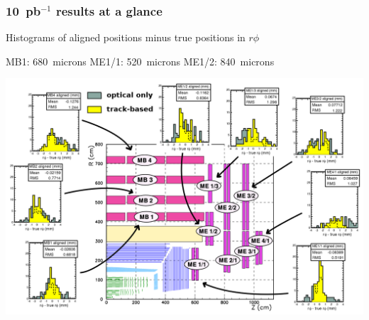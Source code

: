 \documentclass[compress]{beamer}
\begin{document}
\begin{frame}
\frametitle{10~pb$^{-1}$ results at a glance}
\small
Histograms of aligned positions minus true positions in $r\phi$

MB1: 680~microns \hspace{0.3 cm} ME1/1: 520~microns \hspace{0.3 cm} ME1/2: 840~microns

\vfill
\includegraphics[width=\linewidth]{all_results_crop.png}
\end{frame}
\end{document}
